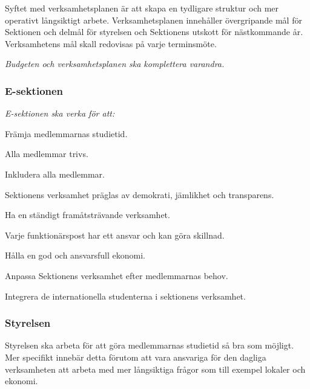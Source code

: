 \documentclass[../_main/handlingar.tex]{subfiles}
\begin{document}
Syftet med verksamhetsplanen är att skapa en tydligare struktur och mer operativt långsiktigt arbete. Verksamhetsplanen innehåller övergripande mål för Sektionen och delmål för styrelsen och Sektionens utskott för nästkommande år. Verksamhetens mål skall redovisas på varje terminsmöte.

\emph{Budgeten och verksamhetsplanen ska komplettera varandra.}

\subsubsection*{E-sektionen}
\emph{E-sektionen ska verka för att:}
\begin{dashlist}
    \item Främja medlemmarnas studietid. 
    \item Alla medlemmar trivs.
    \item Inkludera alla medlemmar. 
    \item Sektionens verksamhet präglas av demokrati, jämlikhet och transparens.
    \item Ha en ständigt framåtsträvande verksamhet. 
    \item Varje funktionärspost har ett ansvar och kan göra skillnad. 
    \item Hålla en god och ansvarsfull ekonomi. 
    \item Anpassa Sektionens verksamhet efter medlemmarnas behov.
    \item Integrera de internationella studenterna i sektionens verksamhet.
\end{dashlist}

\subsubsection*{Styrelsen}
Styrelsen ska arbeta för att göra medlemmarnas studietid så bra som möjligt. Mer specifikt innebär detta förutom att vara ansvariga för den dagliga verksamheten att arbeta med mer långsiktiga frågor som till exempel lokaler och ekonomi. 
\end{document}
